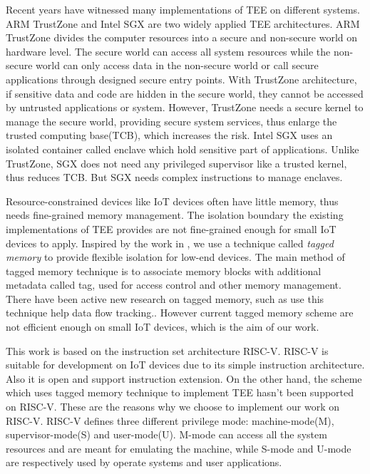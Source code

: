 \documentclass[conference]{IEEEtran}
\begin{document}
Recent years have witnessed many implementations of TEE on different systems. ARM TrustZone and Intel SGX are two widely applied TEE architectures. ARM TrustZone divides the computer resources into a secure and non-secure world on hardware level.\cite{TrustZone} The secure world can access all system resources while the non-secure world can only access data in the non-secure world or call secure applications through designed secure entry points. With TrustZone architecture, if sensitive data and code are hidden in the secure world, they cannot be accessed by untrusted applications or system. However, TrustZone needs a secure kernel to manage the secure world, providing secure system services, thus enlarge the trusted computing base(TCB), which increases the risk. Intel SGX uses an isolated container called enclave which hold sensitive part of applications.\cite{SGX} Unlike TrustZone, SGX does not need any privileged supervisor like a trusted kernel, thus reduces TCB. But SGX needs complex instructions to manage enclaves.

Resource-constrained devices like IoT devices often have little memory, thus needs fine-grained memory management. The isolation boundary the existing implementations of TEE provides are not fine-grained enough for small IoT devices to apply.\cite{TIMBERV} Inspired by the work in \cite{TIMBERV}, we use a technique called \emph{tagged memory} to provide flexible isolation for low-end devices. The main method of tagged memory technique is to associate memory blocks with additional metadata called tag, used for access control and other memory management. There have been active new research on tagged memory, such as use this technique help data flow tracking.\cite{HDFI}. However current tagged memory scheme are not efficient enough on small IoT devices\cite{TIMBERV}, which is the aim of our work.

This work is based on the instruction set architecture RISC-V.\cite{RISCV} RISC-V is suitable for development on IoT devices due to its simple instruction architecture. Also it is open and support instruction extension. On the other hand, the scheme which uses tagged memory technique to implement TEE hasn't been supported on RISC-V. These are the reasons why we choose to implement our work on RISC-V. RISC-V defines three different privilege mode: machine-mode(M), supervisor-mode(S) and user-mode(U). M-mode can access all the system resources and are meant for emulating the machine, while S-mode and U-mode are respectively used by operate systems and user applications.
\end{document}
